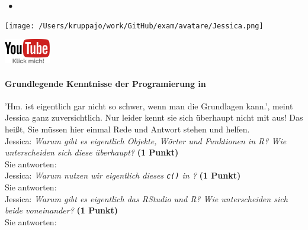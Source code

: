 \documentclass[a4paper, 9pt]{scrartcl}\usepackage[]{graphicx}\usepackage[]{xcolor}
\begin{document}
 
\ifcollection
\begin{flushright}
\tiny\vspace{-3Ex}
\textbf{\examinhaltstart}
\exammodulemathstat $\;\bullet$
\exammodulestat 
\vspace{-4Ex}
\end{flushright}
\begin{minipage}[t]{0.5\textwidth}
\texttt{[image: /Users/kruppajo/work/GitHub/exam/avatare/Jessica.png]}
\end{minipage}
\begin{minipage}[t]{0.5\textwidth}
\hfill
\href{https://www.youtube.com/playlist?list=PLe51bCp9JvEFUnFqaJG5aRmON9i1ZbOYC}{\includegraphics[width = 2cm]{img/youtube}}
\end{minipage}
\vspace{-3ex}
\fi



\ifcollection
\paragraph{Grundlegende Kenntnisse der Programierung in \Rlogo}
\fi

'Hm. \Rlogo ist eigentlich gar nicht so schwer, wenn man die Grundlagen kann.', meint  Jessica ganz zuversichtlich. Nur leider kennt sie sich überhaupt nicht mit \Rlogo aus! Das heißt, Sie müssen hier einmal Rede und Antwort stehen und helfen.\\[1Ex]

Jessica: \textit{Warum gibt es eigentlich Objekte, Wörter und Funktionen in R? Wie unterscheiden sich diese überhaupt?} \textbf{(1 Punkt)}\\[1ex]
Sie antworten:\\[3Ex]

Jessica: \textit{Warum nutzen wir eigentlich dieses \texttt{c()} in \Rlogo?} \textbf{(1 Punkt)}\\[1ex]
Sie antworten:\\[3Ex]

Jessica: \textit{Warum gibt es eigentlich das RStudio und R? Wie unterscheiden sich beide voneinander?} \textbf{(1 Punkt)}\\[1ex]
Sie antworten:\\[3Ex]
\end{document}
